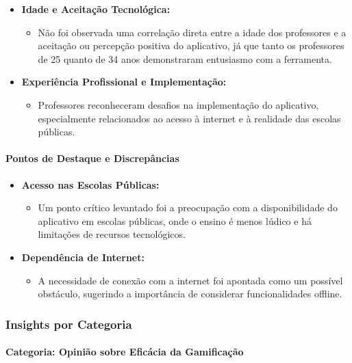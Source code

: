 \begin{itemize}
    \item \textbf{Idade e Aceitação Tecnológica:}
    \begin{itemize}
        \item Não foi observada uma correlação direta entre a idade dos professores e a aceitação ou percepção positiva do aplicativo, já que tanto os professores de 25 quanto de 34 anos demonstraram entusiasmo com a ferramenta.
    \end{itemize}
    \item \textbf{Experiência Profissional e Implementação:}
    \begin{itemize}
        \item Professores reconheceram desafios na implementação do aplicativo, especialmente relacionados ao acesso à internet e à realidade das escolas públicas.
    \end{itemize}
\end{itemize}

\paragraph{Pontos de Destaque e Discrepâncias}

\begin{itemize}
    \item \textbf{Acesso nas Escolas Públicas:}
    \begin{itemize}
        \item Um ponto crítico levantado foi a preocupação com a disponibilidade do aplicativo em escolas públicas, onde o ensino é menos lúdico e há limitações de recursos tecnológicos.
    \end{itemize}
    \item \textbf{Dependência de Internet:}
    \begin{itemize}
        \item A necessidade de conexão com a internet foi apontada como um possível obstáculo, sugerindo a importância de considerar funcionalidades offline.
    \end{itemize}
\end{itemize}

\subsubsection{Insights por Categoria}

\paragraph{Categoria: Opinião sobre Eficácia da Gamificação}

